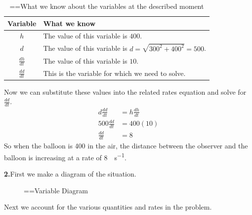 \documentclass[10pt,oneside,]{book}
\theoremstyle{plain}
\theoremstyle{definition}
\numberwithin{equation}{section}
\newcommand{\lz}[2]{\frac{d#1}{d#2}}
\begin{document}
\begin{table}
\centering
\caption{\binoppenalty=\maxdimen \relpenalty=\maxdimen What we know about the variables at the described moment\label{table-38}}
\begin{tabular}{cp{4in}}
\toprule
Variable&What we know\\
\midrule
\(h\)&The value of this variable is \(400\).\\
\midrule
\(d\)&The value of this variable is \(d=\sqrt{300^2+400^2}=500\).\\
\midrule
\(\lz{h}{t}\)&The value of this variable is \(10\).\\
\midrule
\(\lz{d}{t}\)&This is the variable for which we need to solve.\\
\bottomrule
\end{tabular}
\end{table}
\par
Now we can substitute these values into the related rates equation and solve for \(\lz{d}{t}\).\begin{align*}
d\lz{d}{t}&=h\lz{h}{t}\\
500\lz{d}{t}&=400(10)\\
\lz{d}{t}&=8
\end{align*}So when the balloon is \SI{400}{\foot} in the air, the distance between the observer and the balloon is increasing at a rate of \SI{8}{\foot\per\second}.%
\par\smallskip
\noindent\textbf{2.}\quad{}First we make a diagram of the situation.%
\begin{figure}
\centering
{
}
\caption{\binoppenalty=\maxdimen \relpenalty=\maxdimen Variable Diagram\label{figure-88}}
\end{figure}
\par
Next we account for the various quantities and rates in the problem.%
\end{document}
